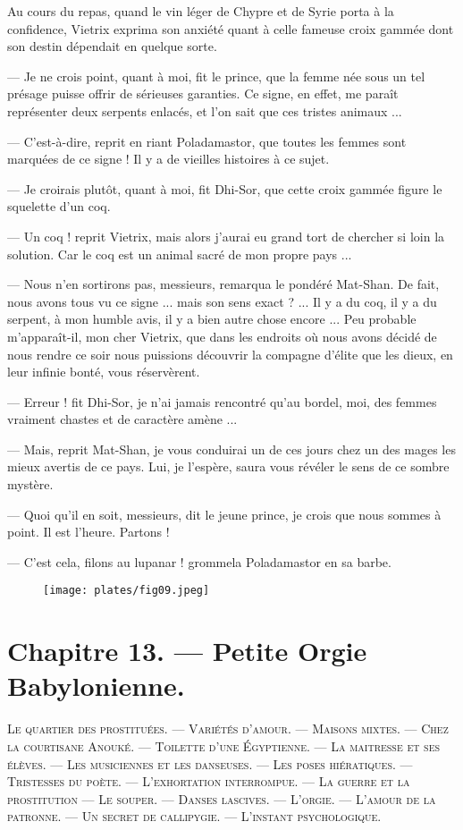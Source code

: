 \documentclass[a4paper, 11pt, oneside, polutonikogreek, french]{article}
\begin{document}
\bigskip
\centerline{\EightStarTaper}
\centerline{\EightStarTaper\EightStarTaper}
\bigskip

Au cours du repas, quand le vin léger de Chypre et de Syrie porta à la confidence, Vietrix exprima son anxiété quant à celle fameuse croix gammée dont son destin dépendait en quelque sorte.

--- Je ne crois point, quant à moi, fit le prince, que la femme née sous un tel présage puisse offrir de sérieuses garanties. Ce signe, en effet, me paraît représenter deux serpents enlacés, et l'on sait que ces tristes animaux ...

--- C'est-à-dire, reprit en riant Poladamastor, que toutes les femmes sont marquées de ce signe ! Il y a de vieilles histoires à ce sujet.

--- Je croirais plutôt, quant à moi, fit Dhi-Sor, que cette croix gammée figure le squelette d'un coq.

--- Un coq ! reprit Vietrix, mais alors j'aurai eu grand tort de chercher si loin la solution. Car le coq est un animal sacré de mon propre pays ...

--- Nous n'en sortirons pas, messieurs, remarqua le pondéré Mat-Shan. De fait, nous avons tous vu ce signe ... mais son sens exact ? ... Il y a du coq, il y a du serpent, à mon humble avis, il y a bien autre chose encore ... Peu probable m'apparaît-il, mon cher Vietrix, que dans les endroits où nous avons décidé de nous rendre ce soir nous puissions découvrir la compagne d'élite que les dieux, en leur infinie bonté, vous réservèrent.

--- Erreur ! fit Dhi-Sor, je n'ai jamais rencontré qu'au bordel, moi, des femmes vraiment chastes et de caractère amène ...

--- Mais, reprit Mat-Shan, je vous conduirai un de ces jours chez un des mages les mieux avertis de ce pays. Lui, je l'espère, saura vous révéler le sens de ce sombre mystère.

--- Quoi qu'il en soit, messieurs, dit le jeune prince, je crois que nous sommes à point. Il est l'heure. Partons !

--- C'est cela, filons au lupanar ! grommela Poladamastor en sa barbe.
\clearpage
\begin{figure}[H]
\centering
\texttt{[image: plates/fig09.jpeg]}
\end{figure}
\section{Chapitre 13. --- Petite Orgie Babylonienne.}
\begin{center}
\scshape
\small
Le quartier des prostituées. --- Variétés d'amour. --- Maisons mixtes. --- Chez la courtisane Anouké. --- Toilette d'une Égyptienne. --- La maitresse et ses élèves. --- Les musiciennes et les danseuses. --- Les poses hiératiques. --- Tristesses du poète. --- L'exhortation interrompue. --- La guerre et la prostitution --- Le souper. --- Danses lascives. --- L'orgie. --- L'amour de la patronne. --- Un secret de callipygie. --- L'instant psychologique.
\end{center}
\end{document}
